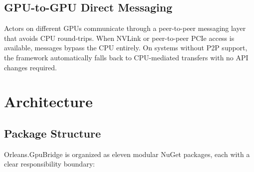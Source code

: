 \documentclass[11pt,a4paper]{article}
\begin{document}
\subsection{GPU-to-GPU Direct Messaging}

Actors on different GPUs communicate through a peer-to-peer messaging
layer that avoids CPU round-trips. When NVLink or peer-to-peer PCIe access
is available, messages bypass the CPU entirely. On systems without P2P
support, the framework automatically falls back to CPU-mediated transfers
with no API changes required.

\section{Architecture}

\subsection{Package Structure}

Orleans.GpuBridge is organized as eleven modular NuGet packages, each with
a clear responsibility boundary:
\end{document}
